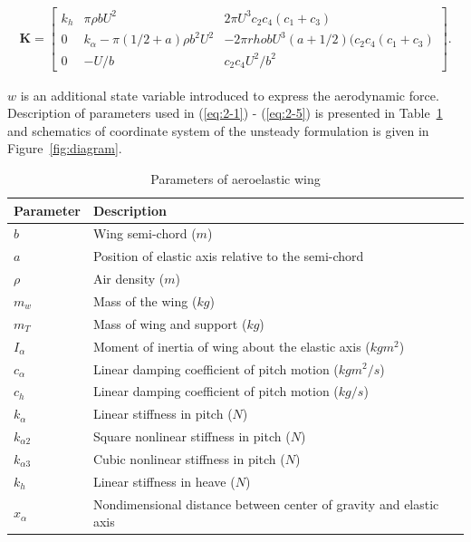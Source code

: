 \documentclass[openacc]{rsproca_new}%
\def\vec#1{\ensuremath{\mathbf{#1}}}
\newcommand{\Eref}[1]{(\ref{#1})}
\newcommand{\Fref}[1]{Figure~\ref{#1}}
\newcommand{\Tref}[1]{Table~\ref{#1}}
\begin{document}
\begin{align}\label{eq:2-5}
\vec K=
\begin{bmatrix}
      k_h        & \pi \rho b U^2  & 2 \pi U^3 c_2 c_4 (c_1+c_3) \\
      0         & k_\alpha - \pi (1/2+a)\rho b^2 U^2 & -2 \pi rho b U^3 (a+1/2)(c_2c_4(c_1+c_3) \\
      0       & -U/b & c_2 c_4U^2/b^2
\end{bmatrix}.
\end{align}

\noindent $w$ is an additional state variable introduced to express the aerodynamic force. Description of parameters used in \Eref{eq:2-1} - \Eref{eq:2-5} is presented in \Tref{wing_par} and schematics of coordinate system of the unsteady formulation is given in \Fref{fig:diagram}.

\begin{table}[!ht]
\caption{Parameters of aeroelastic wing}
\label{wing_par}
\begin{tabular}{ll}%
\hline
Parameter &Description \\
\hline
$b$ & Wing semi-chord ($m$) \\
$a$ & Position of elastic axis relative to the semi-chord  \\
$\rho$ & Air density ($m$) \\
$m_w$ & Mass of the wing ($kg$) \\
$m_T$ & Mass of wing and support ($kg$) \\
$I_\alpha$ & Moment of inertia of wing about the elastic axis ($kg m^2$) \\
$c_\alpha$ & Linear damping coefficient of pitch motion ($kg m^2/s$) \\
$c_h$ & Linear damping coefficient of pitch motion ($kg/s$) \\
$k_\alpha$ & Linear stiffness in pitch ($N$) \\
$k_{\alpha 2}$ & Square nonlinear stiffness in pitch  ($N$) \\
$k_{\alpha 3}$ & Cubic nonlinear stiffness in pitch ($N$) \\
$k_{h}$ & Linear stiffness in heave ($N$) \\
$x_\alpha$ & Nondimensional distance between center of gravity and elastic axis  \\
\hline
\end{tabular}
\vspace*{-4pt}
\end{table}%
\end{document}
